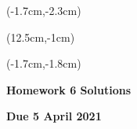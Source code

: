 \documentclass[12pt, oneside]{article}
\begin{document}
\begin{textblock*}{4cm}(-1.7cm,-2.3cm)
\end{textblock*}

\begin{textblock*}{8cm}(12.5cm,-1cm)
\end{textblock*}
\begin{textblock*}{13.5cm}(-1.7cm,-1.8cm)
\end{textblock*}

\vspace{1cm}

\begin{center}
\textbf{\Large Homework 6 Solutions}

\textbf{Due 5 April 2021}
\end{center}
\end{document}
